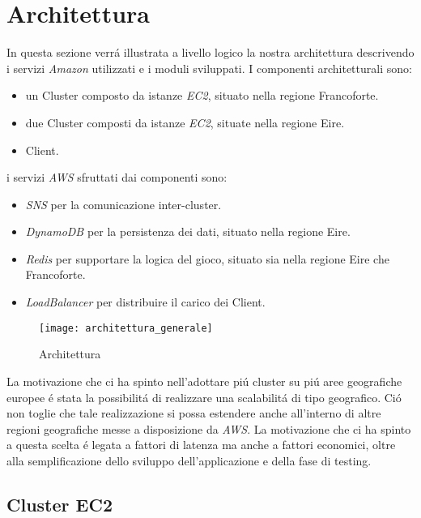 \documentclass{sig-alternate-05-2015}
\begin{document}
\section{Architettura}


In questa sezione verr\'a illustrata a livello logico la nostra architettura descrivendo i servizi \textit{Amazon} utilizzati e i moduli sviluppati.
I componenti architetturali sono:
\begin{itemize}
\item un Cluster composto da istanze \textit{EC2}, situato nella regione Francoforte.
\item due Cluster composti da istanze \textit{EC2}, situate nella regione Eire.
\item Client.
\end{itemize}

i servizi \textit{AWS} sfruttati dai componenti sono:
\begin{itemize}
\item \textit{SNS} per la comunicazione inter-cluster.
\item \textit{DynamoDB} per la persistenza dei dati, situato nella regione Eire.
\item \textit{Redis} per supportare la logica del gioco, situato sia nella regione Eire che Francoforte.
\item \textit{LoadBalancer} per distribuire il carico dei Client. 
\end{itemize}

\begin{figure}\centering
 \texttt{[image: architettura\_generale]} 
 \caption{Architettura} \label{nome} 
 \end{figure}
 
La motivazione che ci ha spinto nell'adottare pi\'u cluster su pi\'u aree geografiche europee \'e stata la possibilit\'a di realizzare una scalabilit\'a di tipo geografico.
Ci\'o non toglie che tale realizzazione si possa estendere anche all'interno di altre regioni geografiche messe a disposizione da \textit{AWS}. La motivazione che ci ha spinto a questa scelta \'e legata a fattori di latenza ma anche a fattori economici, oltre alla semplificazione dello sviluppo dell'applicazione e della fase di testing.




\subsection{Cluster EC2}
\end{document}
